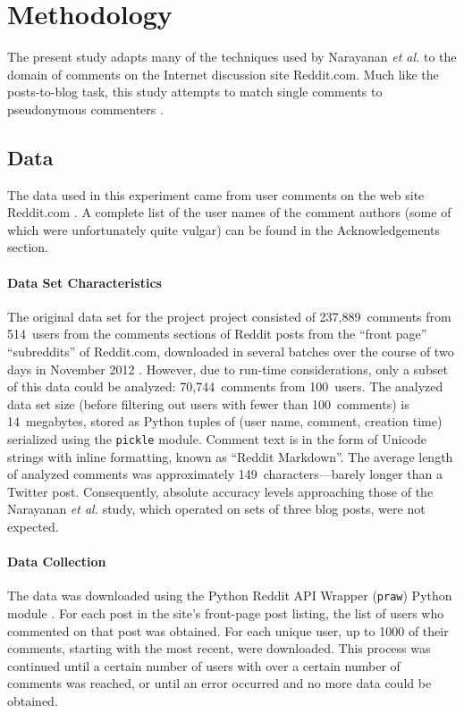 \documentclass[12pt]{article}
\begin{document}
\section{Methodology}

The present study adapts many of the techniques used by Narayanan \textit{et al.} to the domain of comments on the Internet discussion site Reddit.com. Much like the posts-to-blog task, this study attempts to match single comments to pseudonymous commenters \cite{narayanan2012feasibility}.

\subsection{Data}
The data used in this experiment came from user comments on the web site Reddit.com \cite{reddit2012reddit}. A complete list of the user names of the comment authors (some of which were unfortunately quite vulgar) can be found in the Acknowledgements section.

\paragraph{Data Set Characteristics}
The original data set for the project project consisted of 237,889~comments from 514~users from the comments sections of Reddit posts from the ``front page'' ``subreddits'' of Reddit.com, downloaded in several batches over the course of two days in November 2012 \cite{reddit2012reddit}. However, due to run-time considerations, only a subset of this data could be analyzed: 70,744~comments from 100~users. The analyzed data set size (before filtering out users with fewer than 100~comments) is 14~megabytes, stored as Python tuples of (user name, comment, creation time) serialized using the \texttt{pickle} module. Comment text is in the form of Unicode strings with inline formatting, known as ``Reddit Markdown''. The average length of analyzed comments was  approximately 149~characters---barely longer than a Twitter post. Consequently, absolute accuracy levels approaching those of the Narayanan \textit{et al.} study, which operated on sets of three blog posts, were not expected.

\paragraph{Data Collection}
The data was downloaded using the Python Reddit API Wrapper (\texttt{praw}) Python module \cite{boe2012python}. For each post in the site's front-page post listing, the list of users who commented on that post was obtained. For each unique user, up to 1000 of their comments, starting with the most recent, were downloaded. This process was continued until a certain number of users with over a certain number of comments was reached, or until an error occurred and no more data could be obtained.
\end{document}
